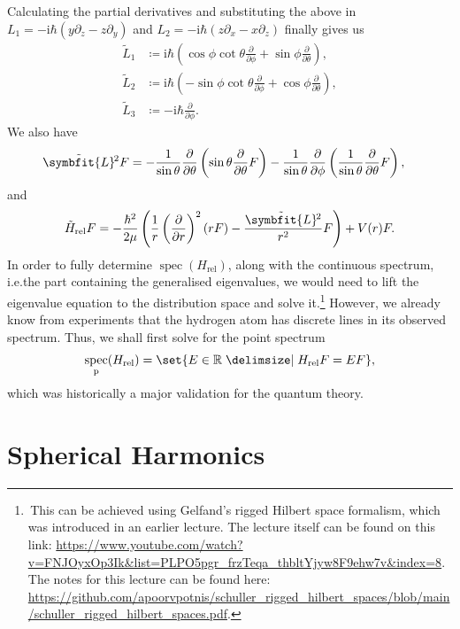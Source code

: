 \documentclass[12pt, a4 paper]{article}
\theoremstyle{definition}
\newcommand{\rr}{\mathbb{R}}
\renewcommand{\i}{\mathrm{i}}
\DeclareMathOperator{\spec}{spec}
\newcommand{\angsone}{\tilde{L}_1}
\newcommand{\angstwo}{\tilde{L}_2}
\newcommand{\angsthree}{\tilde{L}_3}
\newcommand{\lvecsquare}{\tilde{\symbfit{L}}\kern-1pt^2}
\begin{document}
	Calculating the partial derivatives and substituting the above in $L_1 = -\i\hbar(y\partial_z - z\partial_y)$ and $L_2 = -\i\hbar(z\partial_x - x\partial_z)$ finally gives us
	\begin{align*}
		\angsone &\coloneq \i\hbar\left(\cos{\phi}\cot{\theta}\frac{\partial}{\partial\phi} + \sin{\phi}\frac{\partial}{\partial\theta}\right),\\
		\angstwo &\coloneq \i\hbar\left(-\sin{\phi}\cot{\theta}\frac{\partial}{\partial\phi} + \cos{\phi}\frac{\partial}{\partial\theta}\right),\\
		\angsthree &\coloneq -\i\hbar \frac{\partial}{\partial\phi}.
	\end{align*}
	We also have
	\begin{align*}
		\lvecsquare F &= -\frac{1}{\sin{\theta}}\frac{\partial}{\partial \theta}\left(\sin{\theta}\frac{\partial}{\partial\theta}F\right) -\frac{1}{\sin{\theta}}\frac{\partial}{\partial\phi}\left(\frac{1}{\sin{\theta}}\frac{\partial}{\partial\theta}F\right),
	\end{align*}
	and
	\begin{align*}
		\tilde{H}_\text{rel} F = -\frac{\hbar^2}{2\mu}\left(\frac{1}{r}\left(\frac{\partial}{\partial r}\right)^2 (rF) - \frac{\lvecsquare}{r^2}F\right) + V(r)F.
	\end{align*}
	In order to fully determine $\spec(H_\text{rel})$, along with the continuous spectrum, i.e.\@ the part containing the generalised eigenvalues, we would need to lift the eigenvalue equation to the distribution space and solve it.\footnote{\,This can be achieved using Gelfand's rigged Hilbert space formalism, which was introduced in an earlier lecture. The lecture itself can be found on this link: \url{https://www.youtube.com/watch?v=FNJOyxOp3Ik&list=PLPO5pgr_frzTeqa_thbltYjyw8F9ehw7v&index=8}. The notes for this lecture can be found here: \url{https://github.com/apoorvpotnis/schuller_rigged_hilbert_spaces/blob/main/schuller_rigged_hilbert_spaces.pdf}.} However, we already know from experiments that the hydrogen atom has discrete lines in its observed spectrum. Thus, we shall first solve for the point spectrum
	\begin{align*}
		\spec_{\text{p}}(H_\text{rel}) = \set{E \in \rr \given H_\text{rel} F = E F},
	\end{align*}
	which was historically a major validation for the quantum theory.

	\section{Spherical Harmonics}
\end{document}
